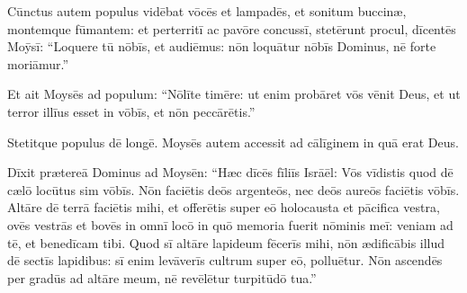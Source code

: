 Cūnctus autem populus
vidēbat vōcēs et lampadēs, et sonitum buccinæ, montemque
fūmantem: et perterritī ac pavōre concussī, stetērunt procul, 
dīcentēs
Moȳsī: ``Loquere tū nōbīs, et audiēmus: nōn loquātur nōbīs Dominus, nē
forte moriāmur.'' 

Et ait Moysēs ad populum: ``Nōlīte timēre: ut
enim probāret vōs vēnit Deus, et ut terror illīus
esset in vōbīs, et nōn peccārētis.''

Stetitque populus dē longē. Moysēs autem accessit ad
cālīginem in quā erat Deus. 

Dīxit prætereā Dominus ad
Moysēn: ``Hæc dīcēs fīliīs Isrāēl: Vōs
vīdistis quod dē cælō locūtus sim vōbīs. 
Nōn faciētis deōs argenteōs,
nec deōs aureōs faciētis vōbīs. 
Altāre dē terrā faciētis mihi, et
offerētis super eō holocausta et
pācifica vestra, ovēs vestrās et bovēs
in omnī locō in quō memoria fuerit nōminis meī: veniam ad tē, et
benedīcam tibi. 
Quod sī altāre lapideum
fēcerīs mihi, nōn ædificābis illud dē sectīs lapidibus: sī
enim levāverīs cultrum super eō, polluētur. 
Nōn ascendēs
per gradūs ad altāre meum, nē revēlētur
turpitūdō tua.''
